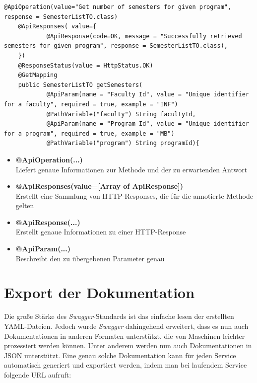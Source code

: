 \begin{lstlisting}[caption={Swagger Konfiguration auf Methoden Ebene am Beispiel des Semester Controllers}]
@ApiOperation(value="Get number of semesters for given program", response = SemesterListTO.class)
    @ApiResponses( value={
            @ApiResponse(code=OK, message = "Successfully retrieved semesters for given program", response = SemesterListTO.class),
    })
    @ResponseStatus(value = HttpStatus.OK)
    @GetMapping
    public SemesterListTO getSemesters(
            @ApiParam(name = "Faculty Id", value = "Unique identifier for a faculty", required = true, example = "INF")
            @PathVariable("faculty") String facultyId,
            @ApiParam(name = "Program Id", value = "Unique identifier for a program", required = true, example = "MB")
            @PathVariable("program") String programId){
\end{lstlisting}

\begin{itemize}
\item \textbf{@ApiOperation(...)}\\
Liefert genaue Informationen zur Methode und der zu erwartenden Antwort\\
\linebreak
\item \textbf{@ApiResponses(value=[Array of ApiResponse])}\\
Erstellt eine Sammlung von \ac{HTTP}-Responses, die für die annotierte Methode gelten
\item \textbf{@ApiResponse(...)}\\
Erstellt genaue Informationen zu einer \ac{HTTP}-Response
\item \textbf{@ApiParam(...)}\\
Beschreibt den zu übergebenen Parameter genau
\end{itemize}

\section{Export der Dokumentation}

Die große Stärke des \textit{Swagger}-Standards ist das einfache lesen der erstellten \ac{YAML}-Dateien. Jedoch wurde \textit{Swagger} dahingehend erweitert, dass es nun auch Dokumentationen in anderen Formaten unterstützt, die von Maschinen leichter prozessiert werden können. Unter anderem werden nun auch Dokumentationen in \ac{JSON} unterstützt. Eine genau solche Dokumentation kann für jeden Service automatisch generiert und exportiert werden, indem man bei laufendem Service folgende \ac{URL} aufruft:


